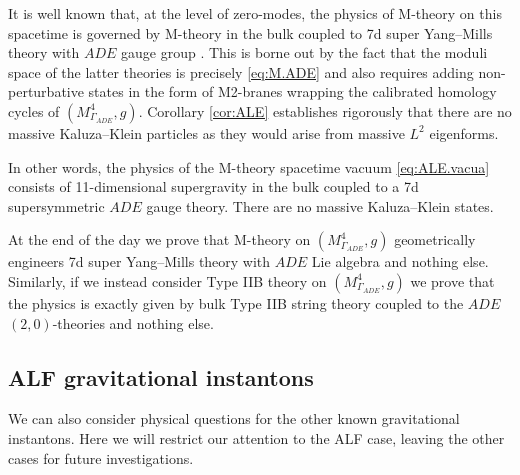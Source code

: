 \documentclass{article}
\theoremstyle{definition}
\numberwithin{thm}{section}
\numberwithin{equation}{section}
\begin{document}
 It is well known that, at the level of zero-modes, the physics of M-theory on this spacetime is governed by M-theory in the bulk coupled to 7d super Yang--Mills theory with $ADE$ gauge group \cite{Hull, Acharya}. This is borne out by the fact that the moduli space of the latter theories is precisely \eqref{eq:M.ADE} and also requires adding non-perturbative states in the form of M2-branes wrapping the calibrated homology cycles of $(M^4_{\Gamma_{ADE}}, g)$.  Corollary \ref{cor:ALE} establishes rigorously that there are no massive Kaluza--Klein particles as they would arise from massive $L^2$ eigenforms.



In other words, the physics of the M-theory spacetime vacuum \eqref{eq:ALE.vacua} 
consists of 11-dimensional supergravity in the bulk coupled to a 7d supersymmetric $ADE$ gauge theory. There are no massive Kaluza--Klein states.

At the end of the day we prove that M-theory on $(M^4_{\Gamma_{ADE}}, g)$ geometrically engineers 7d super Yang--Mills theory with $ADE$ Lie algebra and nothing else.
 Similarly, if we instead consider Type IIB theory on $(M^4_{\Gamma_{ADE}}, g)$ we prove that the physics is exactly given by bulk Type IIB string theory coupled to the $ADE$ $(2,0)$-theories and nothing else.


\subsection{ALF gravitational instantons}

We can also consider physical questions for the other known gravitational instantons. 
Here we will restrict our attention to the ALF case, leaving the other cases for future investigations.
\end{document}

